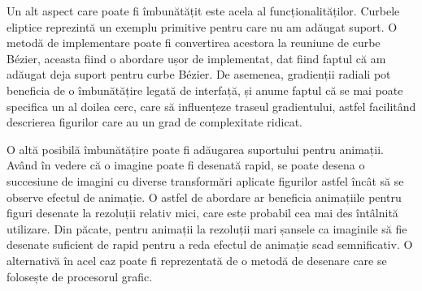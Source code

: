 \documentclass[a4paper, 12pt]{report}
\begin{document}
Un alt aspect care poate fi îmbunătățit este acela al funcționalităților. Curbele eliptice reprezintă un exemplu primitive pentru care nu
am adăugat suport. O metodă de implementare poate fi convertirea acestora la reuniune de curbe Bézier, aceasta fiind o abordare ușor de
implementat, dat fiind faptul că am adăugat deja suport pentru curbe Bézier. De asemenea, gradienții radiali pot beneficia de o îmbunătățire
legată de interfață, și anume faptul că se mai poate specifica un al doilea cerc, care să influențeze traseul gradientului, astfel facilitând
descrierea figurilor care au un grad de complexitate ridicat.

O altă posibilă îmbunătățire poate fi adăugarea suportului pentru animații. Având în vedere că o imagine poate fi desenată rapid, se poate
desena o succesiune de imagini cu diverse transformări aplicate figurilor astfel încât să se observe efectul de animație. O astfel
de abordare ar beneficia animațiile pentru figuri desenate la rezoluții relativ mici, care este probabil cea mai des întâlnită utilizare.
Din păcate, pentru animații la rezoluții mari șansele ca imaginile să fie desenate suficient de rapid pentru a reda efectul de animație scad
semnificativ. O alternativă în acel caz poate fi reprezentată de o metodă de desenare care se folosește de procesorul grafic.

\printbibliography
\end{document}
